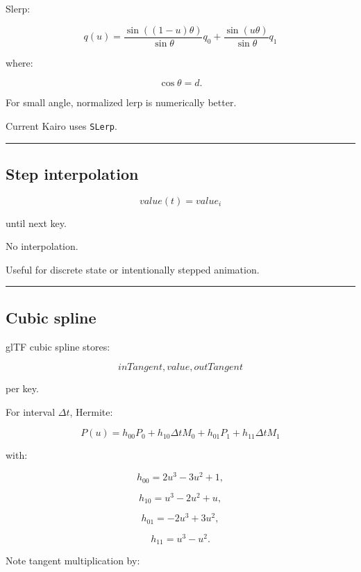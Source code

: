 Slerp:

\[
\boxed{
q(u)
=
\frac{
\sin((1-u)\theta)
}{
\sin\theta
}
q_0
+
\frac{
\sin(u\theta)
}{
\sin\theta
}
q_1
}
\]

where:

\[
\cos\theta=d.
\]

For small angle, normalized lerp is numerically better.

Current Kairo uses \texttt{SLerp}.

\begin{center}\rule{0.5\linewidth}{0.5pt}\end{center}

\subsection{Step interpolation}\label{04-visual-computing-ii-ch041-step-interpolation}

\hypertarget{04-visual-computing-ii-ch041-step-interpolation}{}

\[
value(t)=value_i
\]

until next key.

No interpolation.

Useful for discrete state or intentionally stepped animation.

\begin{center}\rule{0.5\linewidth}{0.5pt}\end{center}

\subsection{Cubic spline}\label{04-visual-computing-ii-ch041-cubic-spline}

\hypertarget{04-visual-computing-ii-ch041-cubic-spline}{}

glTF cubic spline stores:

\[
inTangent,
value,
outTangent
\]

per key.

For interval \(\Delta t\), Hermite:

\[
P(u)
=
h_{00}P_0
+
h_{10}\Delta t M_0
+
h_{01}P_1
+
h_{11}\Delta t M_1
\]

with:

\[
h_{00}=2u^3-3u^2+1,
\]

\[
h_{10}=u^3-2u^2+u,
\]

\[
h_{01}=-2u^3+3u^2,
\]

\[
h_{11}=u^3-u^2.
\]

Note tangent multiplication by:


